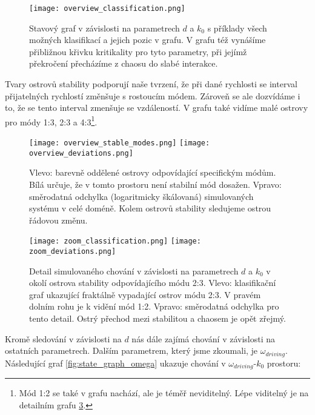 \begin{figure}[H]
    \texttt{[image: overview\_classification.png]}
    \centering
    \caption{Stavový graf v závislosti na parametrech $d$ a $k_0$ s příklady všech možných klasifikací a jejich pozic v grafu. V grafu též vynášíme přibližnou křivku kritikality pro tyto parametry, při jejímž překročení přecházíme z chaosu do slabé interakce.}
    \label{fig:state_graph_whole}
\end{figure}

\clearpage

Tvary ostrovů stability podporují naše tvrzení, že při dané rychlosti se interval přijatelných rychlostí změnšuje s rostoucím módem. Zároveň se ale dozvídáme i to, že se tento interval zmenšuje se vzdáleností. V grafu také vidíme  malé ostrovy pro módy 1:3, 2:3 a 4:3\footnote{Mód 1:2 se také v grafu nachází, ale je téměř neviditelný. Lépe viditelný je na detailním grafu \ref{fig:state_graph_zoom}.}.

\begin{figure}[H]
    \texttt{[image: overview\_stable\_modes.png]}
    \texttt{[image: overview\_deviations.png]}
    \centering
    \caption[Barevné oddělení ostrovů stabilních módů a směrodatná odchylka.]{Vlevo: barevně oddělené ostrovy odpovídající specifickým módům. Bílá určuje, že v tomto prostoru není stabilní mód dosažen. Vpravo: směrodatná odchylka (logaritmicky škálovaná) simulovaných systému v celé doméně. Kolem ostrovů stability sledujeme ostrou řádovou změnu.}
    \label{fig:additional_graphs_whole}
\end{figure}

\begin{figure}[H]
    \texttt{[image: zoom\_classification.png]}
    \texttt{[image: zoom\_deviations.png]}
    \centering
    \caption[Detail simulovaného chování v závislosti na parametrech $d$ a $k_0$ v okolí ostrovu stability odpovídajícího módu 2:3.]{Detail simulovaného chování v závislosti na parametrech $d$ a $k_0$ v okolí ostrova stability odpovídajícího módu 2:3. Vlevo: klasifikační graf ukazující fraktálně vypadající ostrov módu 2:3. V pravém dolním rohu je k vidění mód 1:2. Vpravo: směrodatná odchylka pro tento detail. Ostrý přechod mezi stabilitou a chaosem je opět zřejmý.}
    \label{fig:state_graph_zoom}
\end{figure}

Kromě sledování v závislosti na $d$ nás dále zajímá chování v závislosti na ostatních parametrech. Dalším parametrem, který jsme zkoumali, je $\omega_{driving}$. Následující graf \ref{fig:state_graph_omega} ukazuje chování v $\omega_{driving}$-$k_0$ prostoru:

